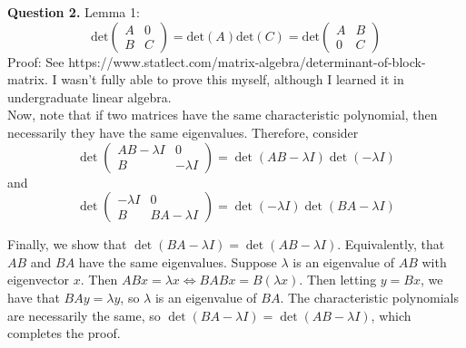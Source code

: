 \documentclass{article}
\begin{document}
\textbf{Question 2.} Lemma 1: 
\begin{equation*}
    \text{det}\begin{pmatrix}
        A&0\\
        B&C
    \end{pmatrix} = \text{det}(A)\text{det}(C) = \text{det}\begin{pmatrix}
        A&B\\
        0&C
    \end{pmatrix}
\end{equation*} 
Proof: See https://www.statlect.com/matrix-algebra/determinant-of-block-matrix. I wasn't fully able to prove this myself, although I learned it in undergraduate linear algebra. \\

Now, note that if two matrices have the same characteristic polynomial, then necessarily they have the same eigenvalues. Therefore, consider 
\begin{equation*}
    \det \begin{pmatrix}
        AB-\lambda I&0\\
        B & -\lambda I
    \end{pmatrix} = \det(AB-\lambda I)\det(-\lambda I)
\end{equation*}
and 
\begin{equation*}
    \det \begin{pmatrix}
        -\lambda I & 0 \\
        B&BA-\lambda I
    \end{pmatrix} = \det(-\lambda I)\det(BA-\lambda I)
\end{equation*}

Finally, we show that $\det(BA-\lambda I) = \det(AB-\lambda I)$. Equivalently, that $AB$ and $BA$ have the same eigenvalues. Suppose $\lambda$ is an eigenvalue of $AB$ with eigenvector $x$. Then $AB x= \lambda x \iff BAB x= B(\lambda x)$. Then letting $y=Bx$, we have that $BA y = \lambda y$, so $\lambda$ is an eigenvalue of $BA$. The characteristic polynomials are necessarily the same, so $\det(BA-\lambda I) = \det(AB-\lambda I)$, which completes the proof. \\
\end{document}
